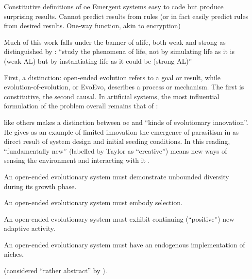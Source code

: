 \begin{DRAFT}

	
Constitutive definitions of \gls{oe}
Emergent systems easy to code but produce surprising results. Cannot predict results from rules (or in fact easily predict rules from desired results. One-way function, akin to encryption) \parencite{Nellis2014}

Much of this work falls under the banner of \gls{alife}, both weak and strong as distinguished by \textcite{Langton1989}: ``study the phenomena of life, not by simulating life as it is (weak AL) but by instantiating life as it could be (strong AL)''

First, a distinction: open-ended evolution refers to a goal or result, while evolution-of-evolution, or EvoEvo, describes a process or mechanism. The first is constitutive, the second causal. In artificial systems, the most influential formulation of the problem overall remains that of \textcite{Bedau:2000mi}:


\parencite{Taylor2001} like others makes a distinction between \gls{oe} and ``kinds of evolutionary innovation''. He gives as an example of limited innovation the emergence of parasitism in \textcite{Ray1991} as direct result of system design and initial seeding conditions. In this reading, ``fundamentally new'' (labelled by Taylor as ``creative'') means new ways of sensing the environment and interacting with it \parencite{Taylor2001}.


\begin{compactitem}
	\item An open-ended evolutionary system must demonstrate unbounded diversity during its growth phase.
	\item An open-ended evolutionary system must embody selection.
	\item An open-ended evolutionary system must exhibit continuing (``positive'') new adaptive activity.
	\item An open-ended evolutionary system must have an endogenous implementation of niches.
\end{compactitem} \textcite{Maley1999} (considered ``rather abstract'' by \textcite[p.341]{Hutton2002}).


\end{DRAFT}
